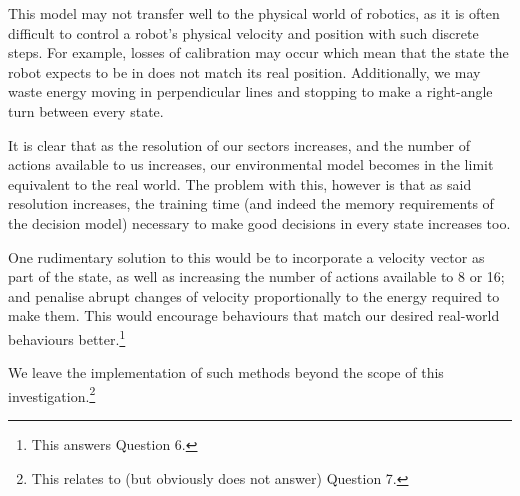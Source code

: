 \documentclass[a4paper, 11pt, twocolumn, final]{article} %
\begin{document}
This model may not transfer well to the physical world of robotics, as it is
often difficult to control a robot's physical velocity and position with such
discrete steps.  For example, losses of calibration may occur which mean that
the state the robot expects to be in does not match its real position.
Additionally, we may waste energy moving in perpendicular lines and stopping to
make a right-angle turn between every state.

It is clear that as the resolution of our sectors increases, and the number of
actions available to us increases, our environmental model becomes in the limit
equivalent to the real world.  The problem with this, however is that as said
resolution increases, the training time (and indeed the memory requirements of
the decision model) necessary to make good decisions in every state increases
too.

One rudimentary solution to this would be to incorporate a velocity vector as
part of the state, as well as increasing the number of actions available to 8 or
16; and penalise abrupt changes of velocity proportionally to the energy
required to make them.  This would encourage behaviours that match our desired
real-world behaviours better.\footnote{This answers Question 6.}

We leave the implementation of such methods beyond the scope of this
investigation.\footnote{This relates to (but obviously does not answer) Question
7.}




\onecolumn \appendix
\end{document}
